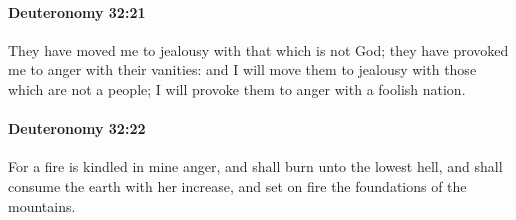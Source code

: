 		\paragraph{Deuteronomy 32:21} %
			\label{DEUTERONOMY-32-21}

			They have moved me to jealousy with that which is not God; they have provoked me to anger with their vanities: and I will move them to jealousy with those which are not a people; I will provoke them to anger with a foolish nation.


		\paragraph{Deuteronomy 32:22} %
			\label{DEUTERONOMY-32-22}

			For a fire is kindled in mine anger, and shall burn unto the lowest hell, and shall consume the earth with her increase, and set on fire the foundations of the mountains.

